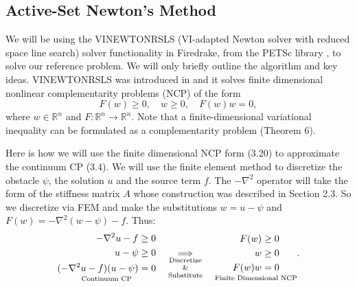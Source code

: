\documentclass[12 pt]{report}
\newcommand{\RR}{\mathbb{R}}
\begin{document}
\subsection{Active-Set Newton's Method}
We will be using the VINEWTONRSLS (VI-adapted Newton solver with reduced space line search) solver functionality in Firedrake, from the PETSc library \citep{balay_petsc_2015}, to solve our reference problem. We will only briefly outline the algorithm and key ideas. VINEWTONRSLS was introduced in \citet{benson_flexible_2003} and it solves finite dimensional nonlinear complementarity problems (NCP) of the form
\begin{equation}
  F(w) \geq 0, \quad w \geq 0, \quad F(w)w = 0, 
\end{equation}
where $w \in \RR^n$ and $F: \RR^n \to \RR^n$. Note that a finite-dimensional variational inequality can be formulated as a complementarity problem \citep{facchinei_finite-dimensional_2003}(Theorem 6). 

Here is how we will use the finite dimensional NCP form (3.20) to approximate the continuum CP (3.4). We will use the finite element method to discretize the obstacle $\psi$, the solution $u$ and the source term $f$. The $-\nabla^2$ operator will take the form of the stiffness matrix $A$ whose construction was described in Section 2.3. So we discretize via FEM and make the substitutions $w = u - \psi$ and $F(w) = -\nabla^2(w - \psi)-f$. Thus: 
\begin{equation}
  \underset{\text{Continuum CP}}{\begin{aligned}
    -\nabla^2u - f &\geq 0\\
    u - \psi &\geq 0\\
    (-\nabla^2u - f)(u - \psi) &= 0
  \end{aligned}}
  \quad
  \underset{\shortstack{\scriptsize \text{Discretize}\\ \scriptsize \text{\&}\\ \scriptsize \text{Substitute}}}{\implies}
  \quad
  \underset{\text{Finite Dimensional NCP}}{\begin{aligned}
    F(w) &\geq 0\\
    w &\geq 0\\
    F(w)w &= 0
  \end{aligned}}.
\end{equation}
\end{document}

